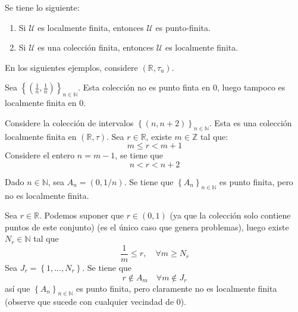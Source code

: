 \documentclass[12pt]{report}
\newcounter{it}
\theoremstyle{largebreak}
\begin{document}
    \begin{obs}
        Se tiene lo siguiente:
        \begin{enumerate}
            \item Si $\mathcal{U}$ es localmente finita, entonces $\mathcal{U}$ es punto-finita.
            \item Si $\mathcal{U}$ es una colección finita, entonces $\mathcal{U}$ es localmente finita.
        \end{enumerate}
    \end{obs}

    En los siguientes ejemplos, considere $(\mathbb{R},\tau_u)$.
    
    \begin{exa}
        Sea $\left\{\left(\frac{1}{n},\frac{1}{n}\right) \right\}_{ n\in\mathbb{N}}$. Esta colección no es punto finta en $0$, luego tampoco es localmente finita en $0$.
    \end{exa}

    \begin{exa}
        Considere la colección de intervalos $\left\{\left(n,n+2\right) \right\}_{ n\in\mathbb{N}}$. Esta es una colección localmente finita en $(\mathbb{R},\tau)$. Sea $r\in\mathbb{R}$, existe $m\in\mathbb{Z}$ tal que:
        \begin{equation*}
            m\leq r<m+1
        \end{equation*}
        Considere el entero $n=m-1$, se tiene que
        \begin{equation*}
            n<r<n+2
        \end{equation*}
    \end{exa}

    \begin{exa}
        Dado $n\in\mathbb{N}$, sea $A_n=(0,1/n)$. Se tiene que $\left\{A_n \right\}_{ n\in\mathbb{N}}$ es punto finita, pero no es localmente finita.

        Sea $r\in\mathbb{R}$. Podemos suponer que $r\in(0,1)$ (ya que la colección solo contiene puntos de este conjunto) (es el único caso que genera problemas), luego existe $N_r\in\mathbb{N}$ tal que
        \begin{equation*}
            \frac{1}{m}\leq r,\quad\forall m\geq N_r
        \end{equation*}
        Sea $J_r=\left\{1,...,N_r \right\}$. Se tiene que
        \begin{equation*}
            r\notin A_m\quad\forall m\notin J_r
        \end{equation*}
        así que $\left\{A_n \right\}_{ n\in\mathbb{N}}$ es punto finita, pero claramente no es localmente finita (observe que sucede con cualquier vecindad de $0$).
    \end{exa}
\end{document}
